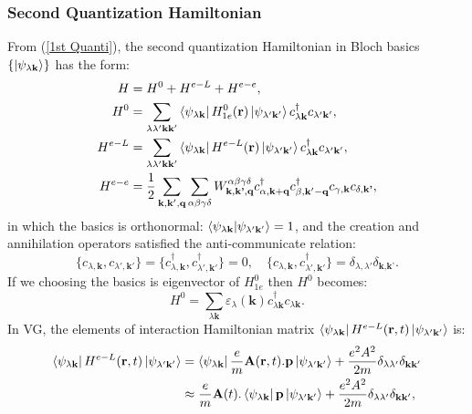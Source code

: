 \documentclass[12pt,english,a4paper]{article}
\newcommand{\dg}{\dagger}
\begin{document}
	\subsubsection{Second Quantization Hamiltonian}
	\quad From (\ref{1st Quanti}), the second quantization Hamiltonian in Bloch basics $\{\ket{\psi_{\lambda \textbf{k}}}\}$ has the form:
	\begin{align}
		H &= H^0 + H^{e-L}  + H^{e-e}\nonumber,\\
		\label{Second Hamiltonian}
		H^0 &= \sum_{\lambda \lambda' \textbf{k}\textbf{k}'} \bra{\psi_{\lambda \textbf{k}}} H^0_{1e} (\textbf{r})\ket{\psi_{\lambda' \textbf{k}'}} c^\dg_{\lambda \textbf{k}} c_{\lambda' \textbf{k}
		'} ,\\
		H^{e-L} &= \sum_{\lambda \lambda' \textbf{k}\textbf{k}'} \bra{\psi_{\lambda \textbf{k}}} H^{e-L} (\textbf{r})\ket{\psi_{\lambda' \textbf{k}'}} c^\dg_{\lambda \textbf{k}} c_{\lambda' \textbf{k}
			'}\nonumber ,\\
H^{e-e}	&= \frac{1}{2} \sum_{\textbf{k}, \textbf{k}', \textbf{q}} \sum_{\alpha \beta \gamma \delta} W^{\alpha \beta \gamma \delta}_{\textbf{k},\textbf{k'},\textbf{q}} c_{\alpha, \textbf{k}+\textbf{q}}^\dg c_{\beta, \textbf{k}' - \textbf{q}}^\dg c_{\gamma, \textbf{k}}c_{\delta, \textbf{k'}} \nonumber,
	\end{align}
	in which the basics is orthonormal: $\braket{\psi_{\lambda \textbf{k}}}{\psi_{\lambda' \textbf{k}'}} = 1$, and the creation and annihilation operators satisfied the anti-communicate relation:
	\begin{equation}
		\label{fermion comm}
		\big\{c_{\lambda,\textbf{k}}, c_{\lambda', \textbf{k}'}\big\} =\big\{c^\dg_{\lambda,\textbf{k}}, c^\dg_{\lambda', \textbf{k}'}\big\} = 0, \quad \big\{c_{\lambda,\textbf{k}}, c^\dg_{\lambda', \textbf{k}'}\big\} = \delta_{\lambda,\lambda'}\delta_{\textbf{k},\textbf{k'}}.
	\end{equation}
	\quad If we choosing the basics is eigenvector of $H^0_{1e}$ then $H^0$ becomes:
	\begin{equation}
		H^0 = \sum_{\lambda \textbf{k}} \varepsilon_{\lambda}(\textbf{k})c^\dg_{\lambda \textbf{k}} c_{\lambda \textbf{k}}.
	\end{equation} 
	\quad In VG, the elements of interaction Hamiltonian matrix $\bra{\psi_{\lambda\textbf{k}}}H^{e-L}(\textbf{r},t)\ket{\psi_{\lambda'\textbf{k}'}}$ is:
	\begin{align}
		\bra{\psi_{\lambda\textbf{k}}}H^{e-L}(\textbf{r},t)\ket{\psi_{\lambda'\textbf{k}'}} &= \bra{\psi_{\lambda\textbf{k}}}\frac{e}{m}\textbf{A}(\textbf{r},t).\textbf{p}\ket{\psi_{\lambda'\textbf{k}'}} +\frac{e^2 A^2}{2m} \delta_{\lambda \lambda'}\delta_{\textbf{k}\textbf{k}'} \nonumber\\
		&\approx \frac{e}{m}\textbf{A}(t). \bra{\psi_{\lambda\textbf{k}}}\textbf{p}\ket{\psi_{\lambda'\textbf{k}'}} + \frac{e^2 A^2}{2m} \delta_{\lambda \lambda'}\delta_{\textbf{k}\textbf{k}'},
	\end{align}
\end{document}
